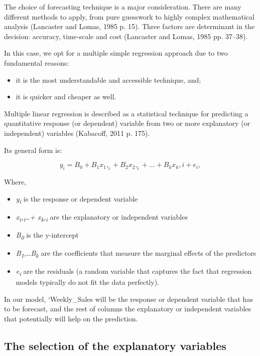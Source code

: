 \documentclass[11pt,]{article}
\providecommand{\tightlist}{%
  \setlength{\itemsep}{0pt}\setlength{\parskip}{0pt}}
\begin{document}
The choice of forecasting technique is a major consideration. There are
many different methods to apply, from pure guesswork to highly complex
mathematical analysis (Lancaster and Lomas, 1985 p. 15). Three factors
are determinant in the decision: accuracy, time-scale and cost
(Lancaster and Lomas, 1985 pp. 37--38).

In this case, we opt for a multiple simple regression approach due to
two fundamental reasons:

\begin{itemize}
\item
  it is the most understandable and accessible technique, and;
\item
  it is quicker and cheaper as well.
\end{itemize}

Multiple linear regression is described as a statistical technique for
predicting a quantitative response (or dependent) variable from two or
more explanatory (or independent) variables (Kabacoff, 2011 p. 175).

Its general form is:

\[{y_i} = {B}_0 + {B}_1{x}_1,_i + {B}_2{x}_2,_i+...+ {B}_k{x}_k,i + {e}_i,\]

Where,

\begin{itemize}
\tightlist
\item
  \emph{y\textsubscript{i}} is the response or dependent variable
\item
  \emph{x\textsubscript{i},\textsubscript{i}\ldots{}+
  x\textsubscript{k},\textsubscript{i}} are the explanatory or
  independent variables
\item
  \emph{B\textsubscript{0}} is the y-intercept
\item
  \emph{B\textsubscript{1},\ldots{}B\textsubscript{k}} are the
  coefficients that measure the marginal effects of the predictors
\item
  \emph{e\textsubscript{i}} are the residuals (a random variable that
  captures the fact that regression models typically do not fit the data
  perfectly).
\end{itemize}

In our model, `Weekly\_Sales will be the response or dependent variable
that has to be forecast, and the rest of columns the explanatory or
independent variables that potentially will help on the prediction.

\subsection{The selection of the explanatory
variables}\label{the-selection-of-the-explanatory-variables}
\end{document}
